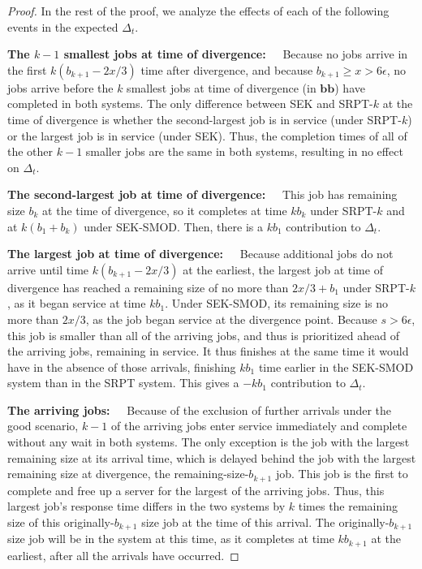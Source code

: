 \documentclass[acmsmall]{acmart}
\newcommand{\bb}{\boldsymbol{b}}
\newcommand{\bbb}{\bb\bb}
\begin{document}
\begin{proof}
In the rest of the proof, we analyze the effects of each of the following events in the expected $\Delta_t$.

\textbf{The $k-1$ smallest jobs at time of divergence:~~}
    Because no jobs arrive in the first $k(b_{k+1}-2x/3)$ time after divergence,
    and because $b_{k+1} \ge x > 6\epsilon$,
    no jobs arrive before the $k$ smallest jobs at time of divergence (in $\bbb$)
    have completed in both systems.
    The only difference between SEK and SRPT-$k$ at the time of divergence is whether the second-largest job is in service (under SRPT-$k$) or the largest job is in service (under SEK).
    Thus, the completion times of all of the other $k-1$ smaller jobs are the same in both systems,
    resulting in no effect on $\Delta_t$.

    \textbf{The second-largest job at time of divergence:~~}
    This job has remaining size $b_k$ at the time of divergence, so it completes at time $kb_k$ under SRPT-$k$ and at $k(b_1+b_k)$ under SEK-SMOD. Then, there is a $kb_1$ contribution to $\Delta_t$.

    \textbf{The largest job at time of divergence:~~}
    Because additional jobs do not arrive until time $k(b_{k+1}-2x/3)$ at the earliest,
    the largest job at time of divergence has reached a remaining size of no more than
    $2x/3+b_1$ under SRPT-$k$, as it began service at time $k b_1$. Under SEK-SMOD, its remaining size is no more than $2x/3$, as the job began service at the divergence point.
    Because $s > 6\epsilon$, this job is smaller than all of the arriving jobs, and thus is prioritized
    ahead of the arriving jobs, remaining in service.
    It thus finishes at the same time it would have in the absence of those arrivals,
    finishing $k b_1$ time earlier in the SEK-SMOD system than in the SRPT system.
    This gives a $-k b_1$ contribution to $\Delta_t$.

    \textbf{The arriving jobs:~~}
    Because of the exclusion of further arrivals under the good scenario, $k-1$ of the arriving jobs enter service immediately and complete without any wait in both systems. 
    The only exception is the job with the largest remaining size at its arrival time,
    which is delayed behind the job with the largest remaining size at divergence,
    the remaining-size-$b_{k+1}$ job.
    This job is the first to complete and free up a server for the largest of the arriving jobs.
    Thus, this largest job's response time
    differs in the two systems by $k$ times the remaining size of this originally-$b_{k+1}$ size job at the time of this arrival.
    The originally-$b_{k+1}$ size job will be in the system at this time, as it completes at time $kb_{k+1}$ at the earliest, after all the arrivals have occurred.


\end{proof}
\end{document}
